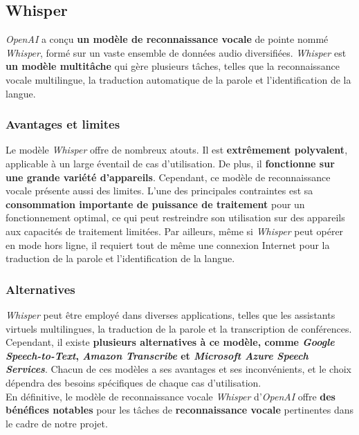 \subsection{Whisper}
\label{subsec:Whisper}

\textit{OpenAI} a conçu \textbf{un modèle de reconnaissance vocale} de pointe nommé \textit{Whisper}, formé sur un vaste ensemble de données audio diversifiées.
\textit{Whisper} est \textbf{un modèle multitâche} qui gère plusieurs tâches, telles que la reconnaissance vocale multilingue,
la traduction automatique de la parole et l'identification de la langue.

\subsubsection*{Avantages et limites}
Le modèle \textit{Whisper} offre de nombreux atouts. Il est \textbf{extrêmement polyvalent}, applicable à un large éventail de cas d'utilisation.
De plus, il \textbf{fonctionne sur une grande variété d'appareils}. Cependant, ce modèle de reconnaissance vocale présente aussi des limites.
L'une des principales contraintes est sa \textbf{consommation importante de puissance de traitement} pour un fonctionnement optimal,
ce qui peut restreindre son utilisation sur des appareils aux capacités de traitement limitées.
Par ailleurs, même si \textit{Whisper} peut opérer en mode hors ligne, il requiert tout de même une connexion Internet pour la traduction
de la parole et l'identification de la langue.

\subsubsection*{Alternatives}

\textit{Whisper} peut être employé dans diverses applications, telles que les assistants virtuels multilingues,
la traduction de la parole et la transcription de conférences. Cependant, il existe
\textbf{plusieurs alternatives à ce modèle, comme \textit{Google Speech-to-Text}, \textit{Amazon Transcribe} et \textit{Microsoft Azure Speech Services}}.
Chacun de ces modèles a ses avantages et ses inconvénients, et le choix dépendra des besoins spécifiques de chaque cas d'utilisation.\\

En définitive, le modèle de reconnaissance vocale \textit{Whisper} d'\textit{OpenAI} offre \textbf{des bénéfices notables} pour les tâches de \textbf{
    reconnaissance vocale} pertinentes dans le cadre de notre projet.
